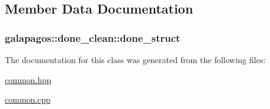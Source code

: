 \subsection{Member Data Documentation}
\subsubsection[{\texorpdfstring{done\+\_\+struct}{done_struct}}]{ galapagos\+::done\+\_\+clean\+::done\+\_\+struct}\hypertarget{classgalapagos_1_1done__clean_ada00b712f0f38b31ed5f73981312bcd1}{}\label{classgalapagos_1_1done__clean_ada00b712f0f38b31ed5f73981312bcd1}


The documentation for this class was generated from the following files\+:\begin{DoxyCompactItemize}
\item 
\hyperlink{common_8hpp}{common.\+hpp}\item 
\hyperlink{common_8cpp}{common.\+cpp}\end{DoxyCompactItemize}
